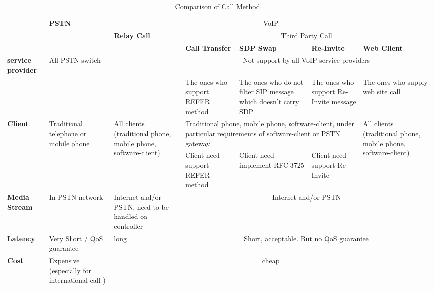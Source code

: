 \label{sec:Analysis:ComparisonOfCallMethod}

\begin{table}[!hbtp]
\centering
\begin{tabular}{|p{0.60in}|p{0.60in}|p{0.65in}|p{0.65in}|p{0.65in}|p{0.65in}|p{0.65in}|}
\hline
        & \multirow{3}{0.65in}{\textbf{PSTN}} &\multicolumn{5}{c|}{VoIP} \\ \cline{3-7}
        &               & \multirow{3}{0.65in}{\textbf{Relay Call}} &\multicolumn{4}{c|}{Third Party Call} \\ \cline{4-7}
 		  &               &                    & \textbf{Call Transfer} &\textbf{SDP Swap} &\textbf{Re-Invite} &\textbf{Web Client} \\\cline{1-7}	
\textbf{service provider} & All PSTN switch & \multirow{2}{0.65in}{support by all VoIP service providers} & \multicolumn{4}{c|}{Not support by all VoIP service providers}\\ \cline{4-7}
& & & The ones who support REFER method & The ones who do not filter SIP message which doesn't carry SDP & The ones who support
Re-Invite message & The ones who supply web site call \\ \cline{1-7}

\textbf{Client} & \multirow{2}{0.65in}{Traditional telephone or mobile phone} &\multirow{2}{0.65in}{All clients (traditional phone, mobile phone, software-client)} & \multicolumn{3}{p{1.95in}|}{Traditional phone, mobile phone, software-client, under particular requirements of software-client or PSTN gateway} & \multirow{2}{0.65in}{All clients (traditional phone, mobile phone, software-client)} \\ \cline{4-6}
& & & Client need support REFER method  & Client need implement RFC 3725 & Client need support Re-Invite & \\ \cline{1-7}
\textbf{Media Stream} & In PSTN network & Internet and/or PSTN, need to be handled on controller & \multicolumn{4}{c|}{Internet and/or PSTN}\\ \cline{1-7}
\textbf{Latency} & Very Short / QoS guarantee & long & \multicolumn{4}{c|}{Short, acceptable. But no QoS guarantee} \\ \cline{1-7}
\textbf{Cost} & Expensive (especially for international call ) & \multicolumn{5}{c|}{cheap} \\
\hline
\end{tabular}
\caption{Comparison of Call Method}
\label{table:ComparisonOfCallMethod}
\end{table}

